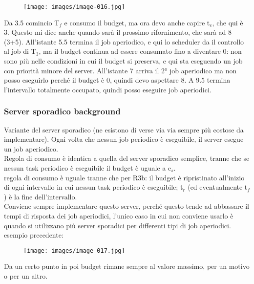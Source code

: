 \documentclass[12pt, oneside]{extbook}
\begin{document}
\begin{figure}[!h]
\centering
\texttt{[image: images/image-016.jpg]}
\end{figure}
Da 3.5 comincio T$_{f}$ e consumo il budget, ma ora devo anche capire t$_{e}$, che qui è 3. Questo mi dice anche quando sarà il prossimo rifornimento, che sarà ad 8 (3+5). All'istante 5.5 termina il job aperiodico, e qui lo scheduler da il controllo al job di T$_{3}$, ma il budget continua ad essere consumato fino a diventare 0: non sono più nelle condizioni in cui il budget si preserva, e qui sta eseguendo un job con priorità minore del server. All'istante 7 arriva il 2° job aperiodico ma non posso eseguirlo perché il budget è 0, quindi devo aspettare 8. A 9.5 termina l'intervallo totalmente occupato, quindi posso eseguire job aperiodici.
\subsubsection{Server sporadico background}
Variante del server sporadico (ne esistono di verse via via sempre più costose da implementare). Ogni volta che nessun job periodico è eseguibile, il server esegue un job aperiodico.\\ Regola di consumo è identica a quella del server sporadico semplice, tranne che se nessun task periodico è eseguibile il budget è uguale a e$_{s}$. \\ regola di consumo è uguale tranne che per R3b: il budget è ripristinato all'inizio di ogni intervallo in cui nessun task periodico è eseguibile; t$_{r}$ (ed eventualmente t$_{f}$) è la fine dell'intervallo.\\ Conviene sempre implementare questo server, perché questo tende ad abbassare il tempi di risposta dei job aperiodici, l'unico caso in cui non conviene usarlo è quando si utilizzano più server sporadici per differenti tipi di job aperiodici.\\ esempio precedente:\\
\begin{figure}[!h]
\centering
\texttt{[image: images/image-017.jpg]}
\end{figure} 
Da un certo punto in poi budget rimane sempre al valore massimo, per un motivo o per un altro.
\end{document}
